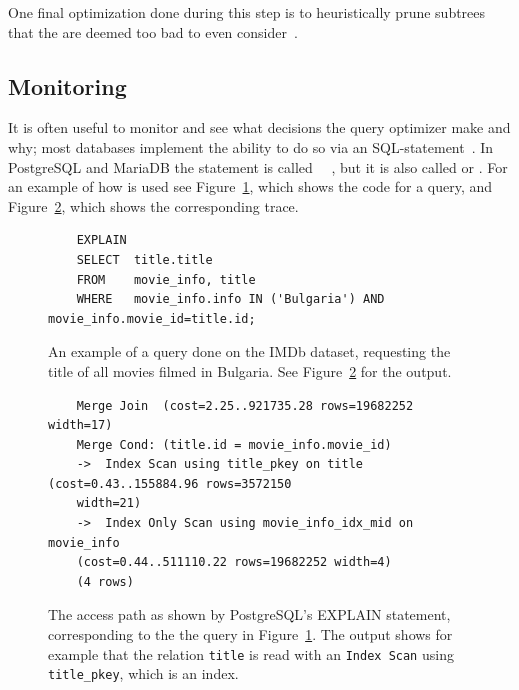 One final optimization done during this step is to heuristically prune
subtrees that the are deemed too bad to even
consider~\cite{ono_1990_measuring_mtcojeiqo}.

\subsection{Monitoring}
It is often useful to monitor and see what decisions the query optimizer make
and why; most databases implement the ability to do so via an
SQL-statement~\cite[p. 34]{lahdenmaki_2005_relational_rdidatodossea}. In
PostgreSQL and MariaDB the statement is called
~\cite{postgresql_pd9e}~\cite{explain_emkb}, but it is also called
 or . For an example of how  is
used see Figure~\ref{fig:sql:explainquery}, which shows the code for a query,
and Figure~\ref{fig:sql:explaintrace}, which shows the corresponding trace.

\begin{figure}[ht]
  \begin{verbatim}
    EXPLAIN
    SELECT  title.title
    FROM    movie_info, title
    WHERE   movie_info.info IN ('Bulgaria') AND movie_info.movie_id=title.id;
  \end{verbatim}
  \caption[An example query to ]{An example of a query done on the
    IMDb dataset, requesting the title of all movies filmed in Bulgaria. See
    Figure~\ref{fig:sql:explaintrace} for the
    output.}\label{fig:sql:explainquery}
\end{figure}

\begin{figure}[ht]
  \begin{lstlisting}
    Merge Join  (cost=2.25..921735.28 rows=19682252 width=17)
    Merge Cond: (title.id = movie_info.movie_id)
    ->  Index Scan using title_pkey on title  (cost=0.43..155884.96 rows=3572150
    width=21)
    ->  Index Only Scan using movie_info_idx_mid on movie_info
    (cost=0.44..511110.22 rows=19682252 width=4)
    (4 rows)
  \end{lstlisting}
  \caption[An example of an  trace]{The access path as shown by
    PostgreSQL's EXPLAIN statement, corresponding to the the query in
    Figure~\ref{fig:sql:explainquery}. The output shows for example that the
    relation \texttt{title} is read with an \texttt{Index Scan} using
    \texttt{title\_pkey}, which is an index.}\label{fig:sql:explaintrace}
\end{figure}

